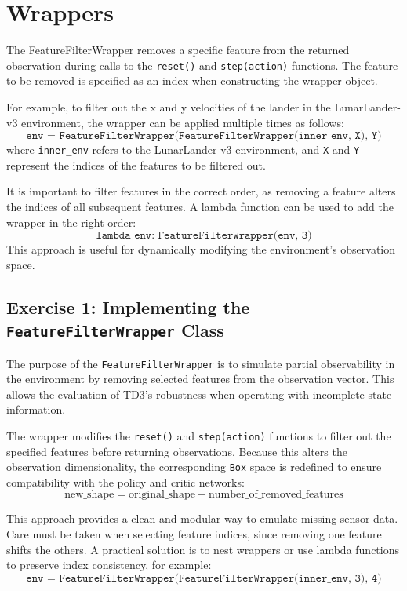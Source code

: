 \documentclass[12pt, a4paper]{article}
\begin{document}
\section{Wrappers}

The FeatureFilterWrapper removes a specific feature from the returned observation during calls to the \texttt{reset()} and \texttt{step(action)} functions. The feature to be removed is specified as an index when constructing the wrapper object.

For example, to filter out the x and y velocities of the lander in the LunarLander-v3 environment, the wrapper can be applied multiple times as follows:
\[
\texttt{env = FeatureFilterWrapper(FeatureFilterWrapper(inner\_env, X), Y)}
\]
where \texttt{inner\_env} refers to the LunarLander-v3 environment, and \texttt{X} and \texttt{Y} represent the indices of the features to be filtered out.

It is important to filter features in the correct order, as removing a feature alters the indices of all subsequent features. A lambda function can be used to add the wrapper in the right order:
\[
\texttt{lambda env: FeatureFilterWrapper(env, 3)}
\]
This approach is useful for dynamically modifying the environment's observation space.

\subsection{Exercise 1: Implementing the \texttt{FeatureFilterWrapper} Class}


The purpose of the \texttt{FeatureFilterWrapper} is to simulate partial observability in the  environment by removing selected features from the observation vector. This allows the evaluation of TD3’s robustness when operating with incomplete state information.

The wrapper modifies the \texttt{reset()} and \texttt{step(action)} functions to filter out the specified features before returning observations. Because this alters the observation dimensionality, the corresponding \texttt{Box} space is redefined to ensure compatibility with the policy and critic networks:
\[
\text{new\_shape} = \text{original\_shape} - \text{number\_of\_removed\_features}
\]

This approach provides a clean and modular way to emulate missing sensor data. Care must be taken when selecting feature indices, since removing one feature shifts the others. A practical solution is to nest wrappers or use lambda functions to preserve index consistency, for example:
\[
\texttt{env = FeatureFilterWrapper(FeatureFilterWrapper(inner\_env, 3), 4)}
\]
\end{document}
